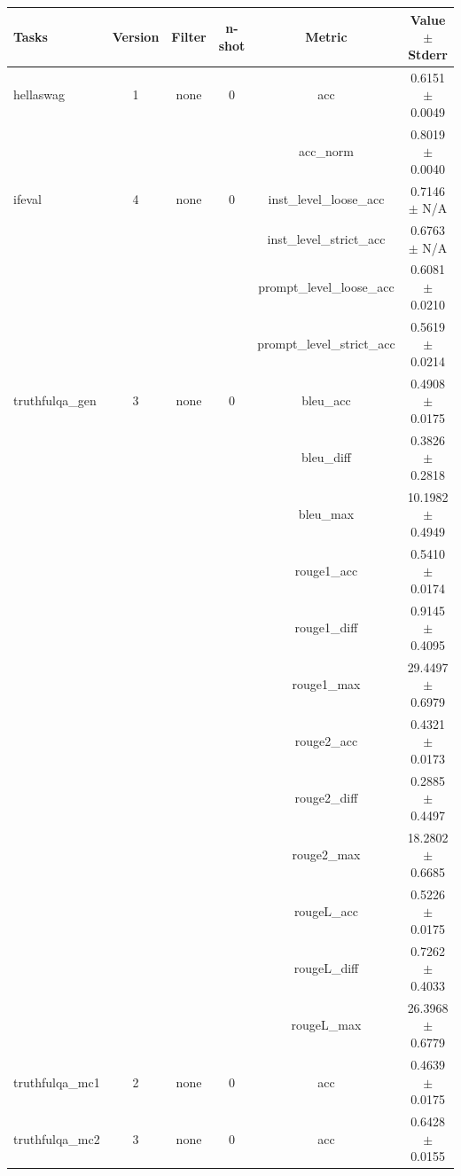\documentclass{ifacconf}
\begin{document}
\begin{strip}
\begin{minipage}{\textwidth}
			\begin{table}[H]
				\centering
				\begin{tabular}{|l|c|c|c|c|c|}
					\hline
					\textbf{Tasks} & \textbf{Version} & \textbf{Filter} & \textbf{n-shot} & \textbf{Metric} & \textbf{Value} $\pm$ \textbf{Stderr} \\ \hline
					hellaswag & 1 & none & 0 & acc & 0.6151 $\pm$ 0.0049 \\ \hline
					& & & & acc\_norm & 0.8019 $\pm$ 0.0040 \\ \hline
					ifeval & 4 & none & 0 & inst\_level\_loose\_acc & 0.7146 $\pm$ N/A \\ \hline
					& & & & inst\_level\_strict\_acc & 0.6763 $\pm$ N/A \\ \hline
					& & & & prompt\_level\_loose\_acc & 0.6081 $\pm$ 0.0210 \\ \hline
					& & & & prompt\_level\_strict\_acc & 0.5619 $\pm$ 0.0214 \\ \hline
					truthfulqa\_gen & 3 & none & 0 & bleu\_acc & 0.4908 $\pm$ 0.0175 \\ \hline
					& & & & bleu\_diff & 0.3826 $\pm$ 0.2818 \\ \hline
					& & & & bleu\_max & 10.1982 $\pm$ 0.4949 \\ \hline
					& & & & rouge1\_acc & 0.5410 $\pm$ 0.0174 \\ \hline
					& & & & rouge1\_diff & 0.9145 $\pm$ 0.4095 \\ \hline
					& & & & rouge1\_max & 29.4497 $\pm$ 0.6979 \\ \hline
					& & & & rouge2\_acc & 0.4321 $\pm$ 0.0173 \\ \hline
					& & & & rouge2\_diff & 0.2885 $\pm$ 0.4497 \\ \hline
					& & & & rouge2\_max & 18.2802 $\pm$ 0.6685 \\ \hline
					& & & & rougeL\_acc & 0.5226 $\pm$ 0.0175 \\ \hline
					& & & & rougeL\_diff & 0.7262 $\pm$ 0.4033 \\ \hline
					& & & & rougeL\_max & 26.3968 $\pm$ 0.6779 \\ \hline
					truthfulqa\_mc1 & 2 & none & 0 & acc & 0.4639 $\pm$ 0.0175 \\ \hline
					truthfulqa\_mc2 & 3 & none & 0 & acc & 0.6428 $\pm$ 0.0155 \\ \hline
				\end{tabular}
				\label{tab:qwen25_q4km}
			\end{table}
		\end{minipage}
	\end{strip}
	
\end{document}
